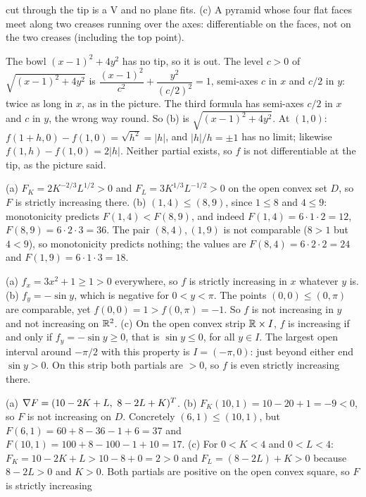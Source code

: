\begin{solutions}
        cut through the tip is a V and no plane fits. (c) A pyramid whose
        four flat faces meet along two creases running over the axes:
        differentiable on the faces, not on the two creases (including
        the top point).
  \item The bowl $(x-1)^{2}+4y^{2}$ has no tip, so it is out. The level
        $c>0$ of $\sqrt{(x-1)^{2}+4y^{2}}$ is
        $\dfrac{(x-1)^{2}}{c^{2}}+\dfrac{y^{2}}{(c/2)^{2}}=1$, semi-axes $c$
        in $x$ and $c/2$ in $y$: twice as long in $x$, as in the picture.
        The third formula has semi-axes $c/2$ in $x$ and $c$ in $y$, the
        wrong way round. So (b) is $\sqrt{(x-1)^{2}+4y^{2}}$. At $(1,0)$:
        $f(1+h,0)-f(1,0)=\sqrt{h^{2}}=|h|$, and $|h|/h=\pm1$ has no limit;
        likewise $f(1,h)-f(1,0)=2|h|$. Neither partial exists, so $f$ is
        not differentiable at the tip, as the picture said.
  \item (a) $F_{K}=2K^{-2/3}L^{1/2}>0$ and $F_{L}=3K^{1/3}L^{-1/2}>0$ on
        the open convex set $D$, so $F$ is strictly increasing there.
        (b) $(1,4)\le(8,9)$, since $1\le8$ and $4\le9$: monotonicity
        predicts $F(1,4)<F(8,9)$, and indeed $F(1,4)=6\cdot1\cdot2=12$,
        $F(8,9)=6\cdot2\cdot3=36$. The pair $(8,4),(1,9)$ is not comparable
        ($8>1$ but $4<9$), so monotonicity predicts nothing; the values are
        $F(8,4)=6\cdot2\cdot2=24$ and $F(1,9)=6\cdot1\cdot3=18$.
  \item (a) $f_{x}=3x^{2}+1\ge1>0$ everywhere, so $f$ is strictly
        increasing in $x$ whatever $y$ is. (b) $f_{y}=-\sin y$, which is
        negative for $0<y<\pi$. The points $(0,0)\le(0,\pi)$ are comparable,
        yet $f(0,0)=1>f(0,\pi)=-1$. So $f$ is not increasing in $y$ and not
        increasing on $\mathbb{R}^{2}$. (c) On the open convex strip $\mathbb{R}\times I$,
        $f$ is increasing if and only if $f_{y}=-\sin y\ge0$, that is
        $\sin y\le0$, for all $y\in I$. The largest open interval around
        $-\pi/2$ with this property is $I=(-\pi,0)$: just beyond either end
        $\sin y>0$. On this strip both partials are $>0$, so $f$ is even
        strictly increasing there.
  \item (a) $\grad F=(10-2K+L,\ 8-2L+K)^{T}$. (b) $F_{K}(10,1)=10-20+1=-9<0$,
        so $F$ is not increasing on $D$. Concretely $(6,1)\le(10,1)$, but
        $F(6,1)=60+8-36-1+6=37$ and $F(10,1)=100+8-100-1+10=17$.
        (c) For $0<K<4$ and $0<L<4$: $F_{K}=10-2K+L>10-8+0=2>0$ and
        $F_{L}=(8-2L)+K>0$ because $8-2L>0$ and $K>0$. Both partials are
        positive on the open convex square, so $F$ is strictly increasing

\end{solutions}
